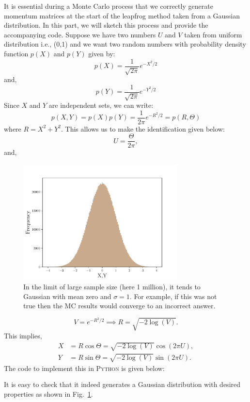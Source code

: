 \documentclass[11pt]{article}
\newcommand{\PY}{\textsc{Python }}
\begin{document}
It is essential during a Monte Carlo process that we correctly generate momentum matrices at the start of the leapfrog method taken from a Gaussian distribution. In this part, we will sketch this process and provide the accompanying code. 
Suppose we have two numbers $U$ and $V$ taken from uniform distribution i.e., (0,1) 
and we want two random numbers with probability density function $p(X)$ and $p(Y)$ given by:
\begin{equation}
	p(X) = \frac{1}{\sqrt{2\pi}} e^{-X^2/2} 
\end{equation}
and, 
\begin{equation}
	p(Y) = \frac{1}{\sqrt{2\pi}} e^{-Y^2/2} 
\end{equation}
Since $X$ and $Y$ are independent sets, we can write:
\begin{equation}
	p(X,Y) = p(X) p(Y) = \frac{1}{2\pi} e^{-R^2/2} = p(R, \Theta) 
\end{equation}
where $R = X^2 + Y^2$. This allows us to make the identification given below:
\begin{equation}
	U = \frac{\Theta}{2\pi}, 
\end{equation}
and, 

\begin{figure}[htbp] 
	\centering 
	\includegraphics[width=0.75\textwidth]{figs/testRN.pdf}
	\caption{\label{fig:RN}In the limit of large sample size (here 1 million), 
	it tends to Gaussian with mean zero and $\sigma=1$. For example, if 
	this was not true then the MC results would converge to an incorrect answer.}
\end{figure}
\begin{equation}
	V = e^{-R^2/2} \implies R = \sqrt{-2 \log(V)}. 
\end{equation}
This implies, 
\begin{align}
	X &= R \cos \Theta = \sqrt{-2 \log(V)} \cos(2 \pi U), \\
	Y &= R \sin \Theta = \sqrt{-2 \log(V)} \sin(2 \pi U).
\end{align}
The code to implement this in \PY is given below: 
\begin{mdframed}[backgroundcolor=mauve!3] 

\end{mdframed} 
It is easy to check that it indeed generates a 
Gaussian distribution with desired properties as shown in Fig.~\ref{fig:RN}. 
\end{document}
